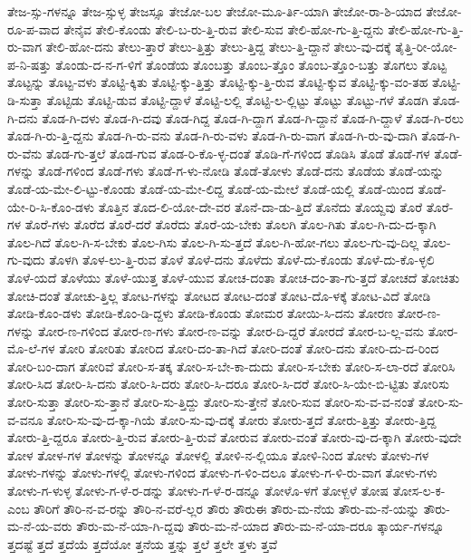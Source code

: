 {ತೇಜ-ಸ್ಸು-ಗಳನ್ನೂ
ತೇಜ-ಸ್ಸುಳ್ಳ
ತೇಜಸ್ಸೂ
ತೇಜೋ-ಬಲ
ತೇಜೋ-ಮೂ-ರ್ತಿ-ಯಾಗಿ
ತೇಜೋ-ರಾ-ಶಿ-ಯಾದ
ತೇಜೋ-ರೂ-ಪ-ವಾದ
ತೇನೈವ
ತೇಲಿ-ಕೊಂಡು
ತೇಲಿ-ಬ-ರು-ತ್ತಿ-ರುವ
ತೇಲಿ-ಸುವ
ತೇಲಿ-ಹೋ-ಗು-ತ್ತಿ-ದ್ದನು
ತೇಲಿ-ಹೋ-ಗು-ತ್ತಿ-ರು-ವಾಗ
ತೇಲಿ-ಹೋ-ದನು
ತೇಲು-ತ್ತಾರೆ
ತೇಲು-ತ್ತಿತ್ತು
ತೇಲು-ತ್ತಿದ್ದ
ತೇಲು-ತ್ತಿ-ದ್ದಾನೆ
ತೇಲು-ವು-ದಕ್ಕೆ
ತೈತ್ತಿ-ರೀ-ಯೋ-ಪ-ನಿ-ಷತ್ತು
ತೊಂಡು-ದ-ನ-ಗ-ಳಿಗೆ
ತೊಂಡೆಯ
ತೊಂಬತ್ತು
ತೊಂಬ-ತ್ತೊಂ
ತೊಂಬ-ತ್ತೊಂ-ಬತ್ತು
ತೊಗಲು
ತೊಟ್ಟ
ತೊಟ್ಟನ್ನು
ತೊಟ್ಟ-ವಳು
ತೊಟ್ಟಿ-ಕ್ಕಿತು
ತೊಟ್ಟಿ-ಕ್ಕು-ತ್ತಿತ್ತು
ತೊಟ್ಟಿ-ಕ್ಕು-ತ್ತಿ-ರುವ
ತೊಟ್ಟಿ-ಕ್ಕುವ
ತೊಟ್ಟಿ-ಕ್ಕು-ವಂ-ತಹ
ತೊಟ್ಟಿ-ಡಿ-ಸುತ್ತಾ
ತೊಟ್ಟಿಡು
ತೊಟ್ಟಿ-ಡುವ
ತೊಟ್ಟಿ-ದ್ದಾಳೆ
ತೊಟ್ಟಿ-ಲಲ್ಲಿ
ತೊಟ್ಟಿ-ಲ-ಲ್ಲಿಟ್ಟು
ತೊಟ್ಟು
ತೊಟ್ಟು-ಗಳೆ
ತೊಡಗಿ
ತೊಡ-ಗಿ-ದನು
ತೊಡ-ಗಿ-ದಳು
ತೊಡ-ಗಿ-ದವು
ತೊಡ-ಗಿದ್ದ
ತೊಡ-ಗಿ-ದ್ದಾಗ
ತೊಡ-ಗಿ-ದ್ದಾನೆ
ತೊಡ-ಗಿ-ದ್ದಾಳೆ
ತೊಡ-ಗಿ-ರಲು
ತೊಡ-ಗಿ-ರು-ತ್ತಿ-ದ್ದನು
ತೊಡ-ಗಿ-ರು-ವನು
ತೊಡ-ಗಿ-ರು-ವಳು
ತೊಡ-ಗಿ-ರು-ವಾಗ
ತೊಡ-ಗಿ-ರು-ವು-ದಾಗಿ
ತೊಡ-ಗಿ-ರು-ವೆನು
ತೊಡ-ಗು-ತ್ತಲೆ
ತೊಡ-ಗುವ
ತೊಡ-ರಿ-ಕೊ-ಳ್ಳ-ದಂತೆ
ತೊಡಿ-ಗೆ-ಗಳಿಂದ
ತೊಡಿಸಿ
ತೊಡೆ
ತೊಡೆ-ಗಳ
ತೊಡೆ-ಗಳನ್ನು
ತೊಡೆ-ಗಳಿಂದ
ತೊಡೆ-ಗಳು
ತೊಡೆ-ಗ-ಳು-ನೋಡಿ
ತೊಡೆ-ತೋಳು
ತೊಡೆ-ದನು
ತೊಡೆಯ
ತೊಡೆ-ಯನ್ನು
ತೊಡೆ-ಯ-ಮೇ-ಲಿ-ಟ್ಟು-ಕೊಂಡು
ತೊಡೆ-ಯ-ಮೇ-ಲಿದ್ದ
ತೊಡೆ-ಯ-ಮೇಲೆ
ತೊಡೆ-ಯಲ್ಲಿ
ತೊಡೆ-ಯಿಂದ
ತೊಡೆ-ಯೇ-ರಿ-ಸಿ-ಕೊಂ-ಡಳು
ತೊತ್ತಿನ
ತೊದ-ಲಿ-ಯೋ-ದೇ-ವರ
ತೊನೆ-ದಾ-ಡು-ತ್ತಿದೆ
ತೊನೆದು
ತೊಯ್ದವು
ತೊರೆ
ತೊರೆ-ಗಳ
ತೊರೆ-ಗಳು
ತೊರೆದ
ತೊರೆ-ದರೆ
ತೊರೆದು
ತೊರೆ-ಯ-ಬೇಕು
ತೊಲಗಿ
ತೊಲ-ಗಿತು
ತೊಲ-ಗಿ-ದು-ದ-ಕ್ಕಾಗಿ
ತೊಲ-ಗಿದೆ
ತೊಲ-ಗಿ-ಸ-ಬೇಕು
ತೊಲ-ಗಿಸು
ತೊಲ-ಗಿ-ಸು-ತ್ತದೆ
ತೊಲ-ಗಿ-ಹೋ-ಗಲು
ತೊಲ-ಗು-ವು-ದಿಲ್ಲ
ತೊಲ-ಗು-ವುದು
ತೊಳಗಿ
ತೊಳ-ಲು-ತ್ತಿ-ರುವ
ತೊಳೆ
ತೊಳೆ-ದನು
ತೊಳೆದು
ತೊಳೆ-ದು-ಕೊಂಡು
ತೊಳೆ-ದು-ಕೊ-ಳ್ಳಲಿ
ತೊಳೆ-ಯದೆ
ತೊಳೆಯು
ತೊಳೆ-ಯುತ್ತ
ತೊಳೆ-ಯುವ
ತೋಚ-ದಂತಾ
ತೋಚ-ದಂ-ತಾ-ಗು-ತ್ತದೆ
ತೋಚದೆ
ತೋಚಿತು
ತೋಚಿ-ದಂತೆ
ತೋಚು-ತ್ತಿಲ್ಲ
ತೋಟ-ಗಳನ್ನು
ತೋಟದ
ತೋಟ-ದಂತೆ
ತೋಟ-ದೊ-ಳಕ್ಕೆ
ತೋಟ-ವಿದೆ
ತೋಡಿ
ತೋಡಿ-ಕೊಂ-ಡಳು
ತೋಡಿ-ಕೊಂ-ಡಿ-ದ್ದಳು
ತೋಡಿ-ಕೊಂಡು
ತೋಮರ
ತೋಯಿ-ಸಿ-ದನು
ತೋರಣ
ತೋರ-ಣ-ಗಳನ್ನು
ತೋರ-ಣ-ಗಳಿಂದ
ತೋರ-ಣ-ಗಳು
ತೋರ-ಣ-ವನ್ನು
ತೋರ-ದಿ-ದ್ದರೆ
ತೋರದೆ
ತೋರ-ಬ-ಲ್ಲ-ವನು
ತೋರ-ಮೊ-ಲೆ-ಗಳ
ತೋರಿ
ತೋರಿತು
ತೋರಿದ
ತೋರಿ-ದಂ-ತಾ-ಗಿದೆ
ತೋರಿ-ದಂತೆ
ತೋರಿ-ದನು
ತೋರಿ-ದು-ದ-ರಿಂದ
ತೋರಿ-ಬಂ-ದಾಗ
ತೋರಿವೆ
ತೋರಿ-ಸ-ತಕ್ಕ
ತೋರಿ-ಸ-ಬೇ-ಕಾ-ದುದು
ತೋರಿ-ಸ-ಬೇಕು
ತೋರಿ-ಸ-ಲಾ-ರದೆ
ತೋರಿಸಿ
ತೋರಿ-ಸಿದ
ತೋರಿ-ಸಿ-ದನು
ತೋರಿ-ಸಿ-ದರು
ತೋರಿ-ಸಿ-ದರೂ
ತೋರಿ-ಸಿ-ದರೆ
ತೋರಿ-ಸಿ-ಯೇ-ಬಿ-ಟ್ಟಿತು
ತೋರಿಸು
ತೋರಿ-ಸುತ್ತಾ
ತೋರಿ-ಸು-ತ್ತಾನೆ
ತೋರಿ-ಸು-ತ್ತಿದ್ದು
ತೋರಿ-ಸು-ತ್ತೇನೆ
ತೋರಿ-ಸುವ
ತೋರಿ-ಸು-ವ-ವ-ನಂತೆ
ತೋರಿ-ಸು-ವ-ವನೂ
ತೋರಿ-ಸು-ವು-ದ-ಕ್ಕಾ-ಗಿಯೆ
ತೋರಿ-ಸು-ವು-ದಕ್ಕೆ
ತೋರು
ತೋರು-ತ್ತದೆ
ತೋರು-ತ್ತಿತ್ತು
ತೋರು-ತ್ತಿದ್ದ
ತೋರು-ತ್ತಿ-ದ್ದರೂ
ತೋರು-ತ್ತಿ-ರುವ
ತೋರು-ತ್ತಿ-ರುವೆ
ತೋರುವ
ತೋರು-ವಂತೆ
ತೋರು-ವು-ದ-ಕ್ಕಾಗಿ
ತೋರು-ವುದೇ
ತೋಳ
ತೋಳ-ಗಳ
ತೋಳನ್ನು
ತೋಳನ್ನೂ
ತೋಳಲ್ಲಿ
ತೋಳಿ-ನ-ಲ್ಲಿಯೂ
ತೋಳಿ-ನಿಂದ
ತೋಳು
ತೋಳು-ಗಳ
ತೋಳು-ಗಳನ್ನು
ತೋಳು-ಗಳಲ್ಲಿ
ತೋಳು-ಗಳಿಂದ
ತೋಳು-ಗ-ಳಿಂ-ದಲೂ
ತೋಳು-ಗ-ಳಿ-ರು-ವಾಗ
ತೋಳು-ಗಳು
ತೋಳು-ಗ-ಳುಳ್ಳ
ತೋಳು-ಗ-ಳೆ-ರ-ಡನ್ನು
ತೋಳು-ಗ-ಳೆ-ರ-ಡನ್ನೂ
ತೋಳೊ-ಳಗೆ
ತೋಳ್ಬಳೆ
ತೋಷ
ತೋಸ-ಲ-ಕ-ಎಂಬ
ತೌರಿಗೆ
ತೌರಿ-ನ-ವ-ರನ್ನು
ತೌರಿ-ನ-ವರೆ-ಲ್ಲರ
ತೌರು
ತೌರುಈ
ತೌರು-ಮ-ನೆಯ
ತೌರು-ಮ-ನೆ-ಯನ್ನು
ತೌರು-ಮ-ನೆ-ಯ-ವರು
ತೌರು-ಮ-ನೆ-ಯಾ-ಗಿ-ದ್ದವು
ತೌರು-ಮ-ನೆ-ಯಾದ
ತೌರು-ಮ-ನೆ-ಯಾ-ದರೂ
ತ್ಕಾರ್ಯ-ಗಳನ್ನೂ
ತ್ತದಷ್ಟೆ
ತ್ತದೆ
ತ್ತದೆಯೆ
ತ್ತದೆಯೋ
ತ್ತನೆಯ
ತ್ತನ್ನು
ತ್ತಲೆ
ತ್ತಲೇ
ತ್ತಳು
ತ್ತವೆ
}

